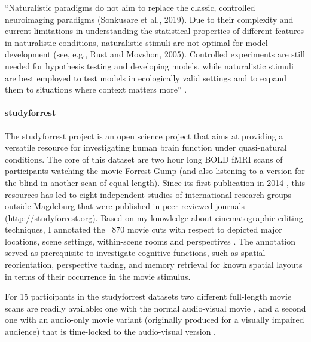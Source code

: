 ``Naturalistic paradigms do not aim to replace the classic, controlled
neuroimaging paradigms (Sonkusare et al., 2019). Due to their complexity and
current limitations in understanding the statistical properties of different
features in naturalistic conditions, naturalistic stimuli are not optimal for
model development (see, e.g., Rust and Movshon, 2005). Controlled experiments
are still needed for hypothesis testing and developing models, while
naturalistic stimuli are best employed to test models in ecologically valid
settings and to expand them to situations where context matters
more'' \citep{saarimaki2021naturalistic}.


\paragraph{studyforrest}
%
%
The studyforrest project is an open science project that aims at providing a
versatile resource for investigating human brain function under quasi-natural
conditions.
%
The core of this dataset are two hour long BOLD fMRI scans of participants
watching the movie Forrest Gump (and also listening to a version for the blind
in another scan of equal length).
%
Since its first publication in 2014 \citep{hanke2014audiomovie}, this resources
has led to eight independent studies of international research groups outside
Magdeburg that were published in peer-reviewed journals
(http://studyforrest.org).
%
Based on my knowledge about cinematographic editing techniques, I annotated the
~870 movie cuts with respect to depicted major locations, scene settings,
within-scene rooms and perspectives \citep{haeusler2016cutanno}.
%
The annotation served as prerequisite to investigate cognitive functions, such
as spatial reorientation, perspective taking, and memory retrieval for known
spatial layouts in terms of their occurrence in the movie stimulus.

For 15 participants in the studyforrest datasets two different full-length movie
scans are readily available: one with the normal audio-visual movie
\citep{hanke2016simultaneous}, and a second one with an audio-only movie variant
(originally produced for a visually impaired audience) that is time-locked to
the audio-visual version \citep{hanke2014audiomovie}.

